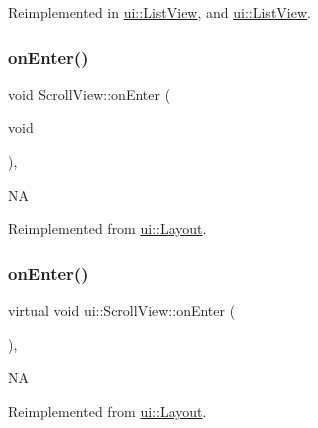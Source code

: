 Reimplemented in \hyperlink{classui_1_1ListView_a7b90df8fdae3bf08a3714c332f8c2854}{ui\+::\+List\+View}, and \hyperlink{classui_1_1ListView_a9410511689cc348ef305886a44ec0d96}{ui\+::\+List\+View}.

\mbox{\label{classui_1_1ScrollView_a1fb1c9ad9108d8c0102af82bfb7ef66d}} 
\subsubsection{\texorpdfstring{on\+Enter()}{onEnter()}\hspace{0.1cm}{\footnotesize\ttfamily [1/2]}}
{\footnotesize\ttfamily void Scroll\+View\+::on\+Enter (\begin{DoxyParamCaption}\item[{void}]{ }\end{DoxyParamCaption})\hspace{0.3cm}{\ttfamily [override]}, {\ttfamily [virtual]}}

NA 

Reimplemented from \hyperlink{classui_1_1Layout_a13b57bb4cec0d694e8053c393499d8b2}{ui\+::\+Layout}.

\mbox{\label{classui_1_1ScrollView_afeb85b1cf1e420b57a66c97c08763138}} 
\subsubsection{\texorpdfstring{on\+Enter()}{onEnter()}\hspace{0.1cm}{\footnotesize\ttfamily [2/2]}}
{\footnotesize\ttfamily virtual void ui\+::\+Scroll\+View\+::on\+Enter (\begin{DoxyParamCaption}{ }\end{DoxyParamCaption})\hspace{0.3cm}{\ttfamily [override]}, {\ttfamily [virtual]}}

NA 

Reimplemented from \hyperlink{classui_1_1Layout_a13b57bb4cec0d694e8053c393499d8b2}{ui\+::\+Layout}.

\mbox{\label{classui_1_1ScrollView_a9c9bf9f6d171a618d57c369e53d91a25}} 
